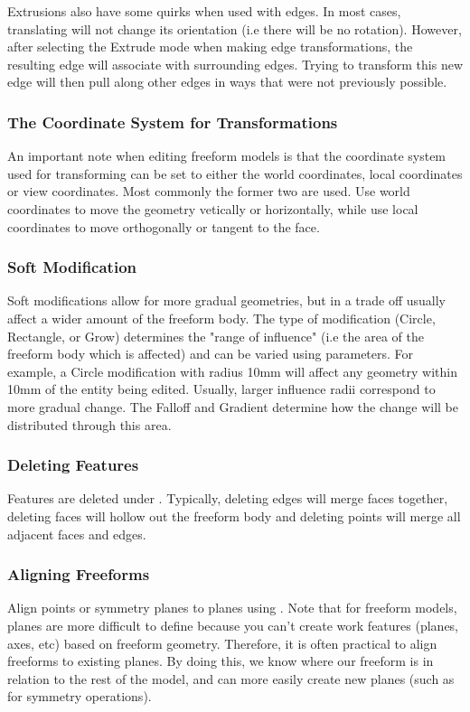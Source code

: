 Extrusions also have some quirks when used with edges. In most cases, translating will not change its orientation (i.e there will be no rotation). However, after selecting the Extrude mode when making edge transformations, the resulting edge will associate with surrounding edges. Trying to transform this new edge will then pull along other edges in ways that were not previously possible. 

\subsubsection{The Coordinate System for Transformations}
An important note when editing freeform models is that the coordinate system used for transforming can be set to either the world coordinates, local coordinates or view coordinates. Most commonly the former two are used. Use world coordinates to move the geometry vetically or horizontally, while use local coordinates to move orthogonally or tangent to the face.

\subsubsection{Soft Modification}
Soft modifications allow for more gradual geometries, but in a trade off usually affect a wider amount of the freeform body. The type of modification (Circle, Rectangle, or Grow) determines the "range of influence" (i.e the area of the freeform body which is affected) and can be varied using parameters. For example, a Circle modification with radius 10mm will affect any geometry within 10mm of the entity being edited. Usually, larger influence radii correspond to more gradual change. The Falloff and Gradient determine how the change will be distributed through this area.

\subsubsection{Deleting Features}
Features are deleted under . Typically, deleting edges will merge faces together, deleting faces will hollow out the freeform body and deleting points will merge all adjacent faces and edges.

\subsubsection{Aligning Freeforms}
Align points or symmetry planes to planes using . Note that for freeform models, planes are more difficult to define because you can't create work features (planes, axes, etc) based on freeform geometry. Therefore, it is often practical to align freeforms to existing planes. By doing this, we know where our freeform is in relation to the rest of the model, and can more easily create new planes (such as for symmetry operations).

